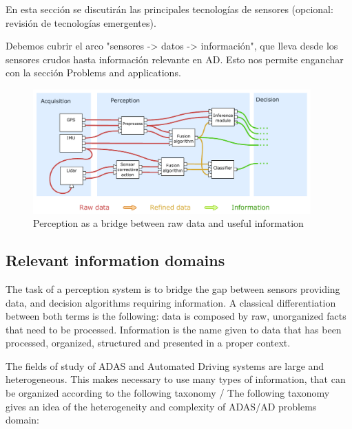 
En esta sección se discutirán las principales tecnologías de sensores (opcional: revisión de tecnologías emergentes).

Debemos cubrir el arco "sensores -> datos -> información", que lleva desde los sensores crudos hasta información relevante en AD. Esto nos permite enganchar con la sección Problems and applications.

\begin{figure}[h]
    \centering
    \includegraphics[width=0.95\textwidth]{"img/data_vs_information"}
    \caption{Perception as a bridge between raw data and useful information}
    \label{fig:data-vs-information}
\end{figure}


\subsection{Relevant information domains}

The task of a perception system is to bridge the gap between sensors providing 
data, and decision algorithms requiring information.
A classical differentiation between both terms is the following: data is 
composed by raw, unorganized facts that need to be processed. 
Information is the name given to data that has been processed, organized, 
structured and presented in a proper context.

The fields of study of ADAS and Automated Driving systems are large and 
heterogeneous.
This makes necessary to use many types of information, that can be organized 
according to the following taxonomy / The following taxonomy gives an idea of 
the heterogeneity and complexity of ADAS/AD problems domain:

